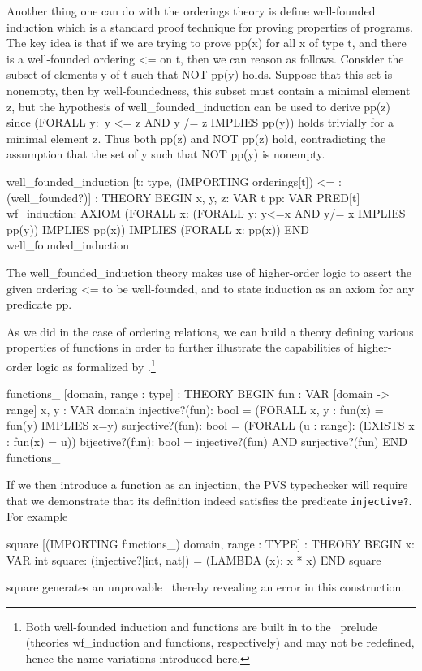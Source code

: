 Another thing one can do with the {\stt orderings} theory is define
well-founded induction which is a standard proof technique for proving
properties of programs.  The key idea is that if we are trying to
prove {\stt pp(x)} for all {\stt x} of type {\stt t}, and there is a
well-founded ordering {\stt <=} on {\stt t}, then we can reason as
follows.  Consider the subset of elements {\stt y} of {\stt t} such
that {\stt NOT pp(y)} holds.  Suppose that this set is nonempty, then
by well-foundedness, this subset must contain a minimal element {\stt
z}, but the hypothesis of {\stt well\_founded\_induction} can be used
to derive {\stt pp(z)} since {\stt (FORALL y:\ y <= z AND y /= z
IMPLIES pp(y))} holds trivially for a minimal element {\stt z}.  Thus
both {\stt pp(z)} and {\stt NOT pp(z)} hold, contradicting the
assumption that the set of {\stt y} such that {\stt NOT pp(y)} is
nonempty.
\begin{pvsex}
  well\_founded\_induction [t: type,
                 (IMPORTING orderings[t])
                 <= : (well\_founded?)] : THEORY
   BEGIN
    x, y, z: VAR t
    pp: VAR PRED[t]
    wf\_induction: AXIOM
      (FORALL x: (FORALL y: y<=x AND y/= x IMPLIES pp(y))
                 IMPLIES pp(x))
      IMPLIES (FORALL x: pp(x))
   END well\_founded\_induction
\end{pvsex}

The {\stt well\_founded\_induction} theory makes use of higher-order
logic to assert the given ordering {\stt <=} to be well-founded, and
to state induction as an axiom for any predicate {\stt pp}.

As we did in the case of ordering relations, we can build a theory
defining various properties of functions in order to further illustrate
the capabilities of higher-order logic as formalized by \pvs\@.\footnote
{Both well-founded induction and functions are built in to the \pvs\
prelude (theories {\stt wf\_induction} and {\stt functions}, respectively)
and may not be redefined, hence the name variations introduced here.}
\begin{pvsex}
  functions\_ [domain, range : type] : THEORY
   BEGIN
    fun : VAR [domain -> range]
    x, y : VAR domain
    injective?(fun): bool = (FORALL x, y : fun(x) = fun(y) IMPLIES x=y)
    surjective?(fun): bool = (FORALL (u : range): (EXISTS x : fun(x) = u))
    bijective?(fun): bool = injective?(fun) AND surjective?(fun)
   END functions\_
\end{pvsex}
%
If we then introduce a function as an injection, the PVS typechecker will
require that we demonstrate that its definition indeed satisfies the
predicate {\tt injective?}.  For example
\begin{pvsex}
  square [(IMPORTING functions\_) domain, range : TYPE] : THEORY
   BEGIN
    x: VAR int
    square: (injective?[int, nat]) = (LAMBDA (x): x * x)
   END square
\end{pvsex}
{\stt square} generates an unprovable \tcc\, thereby revealing an
error in this construction.


